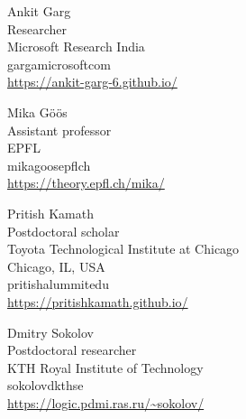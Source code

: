 \documentclass{toc}
\begin{document}
%
%
%
%
%
\begin{tocauthors}
\begin{tocinfo}[garg]
Ankit Garg\\
Researcher\\
Microsoft Research India\\
garga\tocat{}microsoft\tocdot{}com\\
\url{https://ankit-garg-6.github.io/}
\end{tocinfo}

\begin{tocinfo}[goos]
Mika G\"o\"os\\
Assistant professor\\
EPFL\\
mika\tocdot{}goos\tocat{}epfl\tocdot{}ch\\
\url{https://theory.epfl.ch/mika/}
\end{tocinfo}

\begin{tocinfo}[kamath]
Pritish Kamath\\
Postdoctoral scholar\\
Toyota Technological Institute at Chicago\\
Chicago, IL, USA\\
pritish\tocat{}alum\tocdot{}mit\tocdot{}edu\\
\url{https://pritishkamath.github.io/}
\end{tocinfo}

\begin{tocinfo}[sokolov]
Dmitry Sokolov\\
Postdoctoral researcher\\
KTH Royal Institute of Technology\\
sokolovd\tocat{}kth\tocdot{}se\\
\url{https://logic.pdmi.ras.ru/~sokolov/}
\end{tocinfo}
\end{tocauthors}
\end{document}
